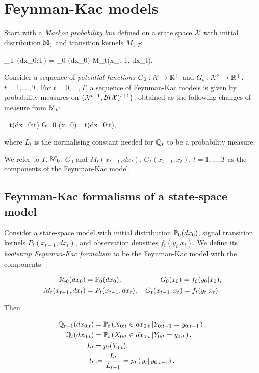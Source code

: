 \section{Feynman-Kac models}

Start with a \textit{Markov probability law} defined on a state space $\mathcal{X}$ with initial distribution $\mathbb{M}_)$ and transition kernels $M_{1:T}$:

\beq
  \M_T (dx_{0:T}) = \M_0 (dx_0)  M_t(x_{t-1}, dx_t).
\eeq

Consider a sequence of \textit{potential functions} $G_0 : \mathcal{X} \to \mathbb{R}^+$ and $G_t: \mathcal{X}^2 \to \mathbb{R}^+$, $t=1, \dots, T$. For $t=0, \dots, T$, a sequence of Feynman-Kac models is given by probability measures on $\left(\mathcal{X}^{t+1}, \mathcal{B} (\mathcal{X})^{t+1}\right)$, obtained as the following changes of measure from $\mathbb{M}_t$:

\beq
  \Q_t(dx_{0:t}) \coloneqq {} G_0 (x_0)  \M_t(dx_{0:t}),
\eeq

where $L_t$ is the normalising constant needed for $\mathbb{Q}_t$ to be a probability measure.

We refer to $T$, $\mathbb{M}_0$, $G_0$ and $M_t(x_{t-1}, dx_t)$, $G_t(x_{t-1}, x_t)$, $t=1, \dots, T$ as the components of the Feynman-Kac model.

\subsection{Feynman-Kac formalisms of a state-space model}

Consider a state-space model with initial distribution $\mathbb{P}_0(dx_0)$, signal transition kernels $P_t(x_{t-1}, dx_t)$, and observation densities $f_t(y_t | x_t)$. We define its \textit{bootstrap Feynman-Kac formalism} to be the Feynman-Kac model with the components:

\begin{align}
  \mathbb{M}_0 (dx_0) &= \mathbb{P}_0(dx_0), \quad \quad \quad \quad \quad \, \, G_0(x_0) = f_0(y_0 | x_0), \label{eq:bfk} \\
  M_t(x_{t-1}, dx_t) &= P_t(x_{t-1}, dx_t), \quad G_t (x_{t-1}, x_t) = f_t(y_t | x_t). \label{eq:bfk2}
\end{align}

Then

\begin{align}
  \mathbb{Q}_{t-1} (dx_{0:t}) &= \mathbb{P}_t\left(X_{0:t} \in dx_{0:t} \left| Y_{0:t-1} = y_{0:t-1}\right.\right), \\
  \mathbb{Q}_t (dx_{0:t}) &= \mathbb{P}_t \left(X_{0:t} \in dx_{0:t} \left| Y_{0:t} = y_{0:t}\right.\right), \\
  L_t &= p_t(Y_{0:t}), \\
  l_t &\coloneqq \frac{L_t}{L_{t-1}} = p_t\left(\left. y_t \right| y_{0:t-1} \right).
\end{align}

